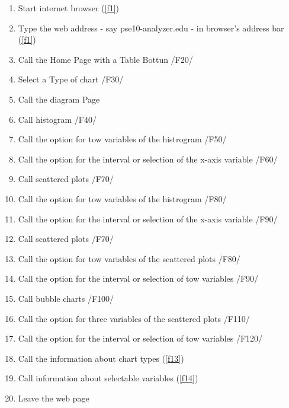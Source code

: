 \begin{enumerate}


\item Start internet browser (\ref{f1})

\item Type the web address - say pse10-analyzer.edu - in browser's address bar (\ref{f1})

\item Call the Home Page with a Table Bottun /F20/ %

\item Select a Type of chart /F30/

\item Call the diagram Page 

\item Call histogram /F40/

\item Call the option for tow variables of the histrogram /F50/

\item Call the option for the interval or selection of the x-axis variable /F60/

\item Call  scattered plots  /F70/

\item Call the option for tow variables of the histrogram /F80/

\item Call the option for the interval or selection of the x-axis variable /F90/

\item Call  scattered plots  /F70/

\item Call the option for tow variables of the scattered plots /F80/

\item Call the option for the interval or selection of tow variables /F90/

\item Call bubble charts /F100/

\item Call the option for three variables of the scattered plots /F110/

\item Call the option for the interval or selection of tow variables /F120/

\item Call the information about chart types (\ref{f13})

\item Call information about selectable variables (\ref{f14})

\item Leave the web page

\end{enumerate}

